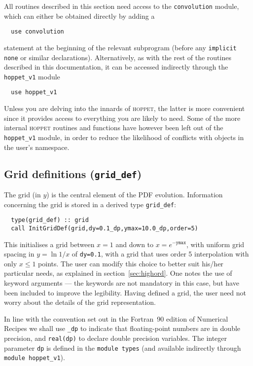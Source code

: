 \documentclass[12pt]{article}
\newcommand{\hoppet}{\textsc{hoppet}\xspace}
\newcommand{\ttt}[1]{\texttt{#1}}
\begin{document}
All routines described in this section need access to the
\texttt{convolution} module, which can either be obtained directly by
adding a 
\begin{lstlisting}
  use convolution
\end{lstlisting}
statement at the beginning of the relevant subprogram (before
any \ttt{implicit none} or similar declarations). Alternatively, as
with the rest of the routines described in this documentation, it can
be accessed indirectly through the \ttt{hoppet\_v1} module
\begin{lstlisting}
  use hoppet_v1
\end{lstlisting}
Unless you are delving into the innards of  \hoppet, the latter is
more convenient since it provides access to everything you are likely
to need. Some of the more internal \hoppet routines and functions
have however been left out of the  \ttt{hoppet\_v1} module, in order
to reduce the likelihood of conflicts with objects in the
user's namespace.

\subsection{Grid definitions (\texttt{grid\_def})}
\label{sec:grid}

The grid (in $y$) is the central element of the PDF evolution.
Information concerning the grid is stored in a derived type
\texttt{grid\_def}:
\begin{lstlisting}
  type(grid_def) :: grid
  call InitGridDef(grid,dy=0.1_dp,ymax=10.0_dp,order=5)
\end{lstlisting}
This initialises a grid between $x=1$ and down to $x =
e^{-\texttt{ymax}}$, with uniform grid spacing in $y = \ln 1/x$ of
\texttt{dy=0.1}, with a grid that uses order 5 interpolation
with only $x\le 1$ points.
The user can modify this choice to better
suit his/her particular needs, as explained
in section~\ref{sec:highord}.
%
One notes 
the use of keyword arguments --- the keywords are not
mandatory in this case, but have been included to improve the
legibility. Having defined a grid, 
the user need not worry about the details of
the grid representation.

In line with the convention set out in the Fortran~90 edition of
Numerical Recipes \cite{NRf90} we shall use \texttt{\_dp} to indicate
that floating-point numbers are in double precision, and \ttt{real(dp)} to declare
double precision variables. The integer parameter \ttt{dp} is defined
in the \texttt{module types} (and available indirectly through
\ttt{module hoppet\_v1}).
\end{document}
